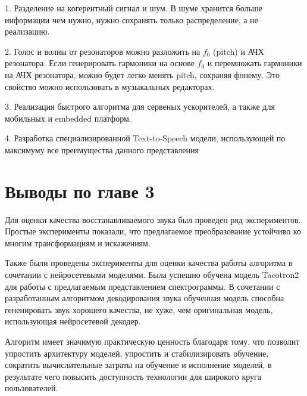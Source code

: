 1. Разделение на когерентный сигнал и шум. В шуме хранится больше информации чем нужно, нужно сохранять только распределение, а не реализацию.

2. Голос и волны от резонаторов можно разложить на $f_0$ (pitch) и АЧХ резонатора. Если генерировать гармоники на основе $f_0$ 
и перемножать гармоники на АЧХ резонатора, можно будет легко менять pitch, сохраняя фонему. 
Это свойство можно использовать в музыкальных редакторах.

3. Реализация быстрого алгоритма для сервеных ускорителей, а также для мобильных и embedded платформ.

4. Разработка специализированной Text-to-Speech модели, использующей по максимуму все преимущества данного представления

\section{Выводы по главе 3}

Для оценки качества восстанавливаемого звука был проведен ряд экспериментов. 
Простые эксперименты показали, что предлагаемое преобразование устойчиво ко многим трансформациям и искажениям.

Также были проведены эксперименты для оценки качества работы алгоритма в сочетании с нейросетевыми моделями. 
Была успешно обучена модель Tacotron2 для работы с предлагаемым представлением спектрограммы.
В сочетании с разработанным алгоритмом декодирования звука обученная модель способна гененировать звук хорошего качества,
не хуже, чем оригинальная модель, использующая нейросетевой декодер.

Алгоритм имеет значимую практическую ценность благодаря тому, что позволит упростить архитектуру моделей, упростить и стабилизировать обучение,
сократить вычислительные затраты на обучение и исполнение моделей, в результате чего повысить доступность технологии для широкого круга пользователей.
